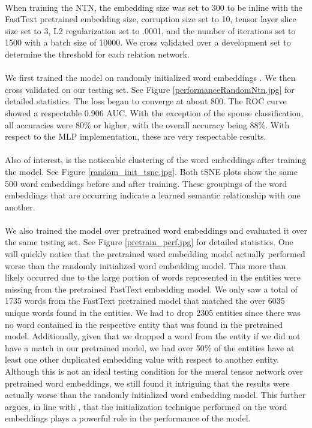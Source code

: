 \documentclass[11.5pt]{article}
\newcounter{Figure}
\begin{document}
\paragraph{} When training the NTN, the embedding size was set to 300 to be inline with the FastText pretrained embedding size, corruption size set to 10, tensor layer slice size set to 3, L2 regularization set to .0001, and the number of iterations set to 1500 with a batch size of 10000. We cross validated over a development set to determine the threshold for each relation network. 

\paragraph{} We first trained the model on randomly initialized word embeddings . We then cross validated on our testing set. See Figure \ref{performanceRandomNtn.jpg} for detailed statistics. The loss began to converge at about 800. The ROC curve showed a respectable 0.906 AUC. With the exception of the spouse classification, all accuracies were 80\% or higher, with the overall accuracy being 88\%. With respect to the MLP implementation, these are very respectable results.

\paragraph{} Also of interest, is the noticeable clustering of the word embeddings after training the model. See Figure \ref{random_init_tsne.jpg}. Both tSNE plots show the same 500 word embeddings before and after training. These groupings of the word embeddings that are occurring indicate a learned semantic relationship with one another.

\paragraph{} We also trained the model over pretrained word embeddings and evaluated it over the same testing set. See Figure \ref{pretrain_perf.jpg} for detailed statistics. One will quickly notice that the pretrained word embedding model actually performed worse than the randomly initialized word embedding model. This more than likely occurred due to the large portion of words represented in the entities were missing from the pretrained FastText embedding model. We only saw a total of 1735 words from the FastText pretrained model that matched the over 6035 unique words found in the entities. We had to drop 2305 entities since there was no word contained in the respective entity that was found in the pretrained model. Additionally, given that we dropped a word from the entity if we did not have a match in our pretrained model, we had over 50\% of the entities have at least one other duplicated embedding value with respect to another entity. Although this is not an ideal testing condition for the nueral tensor network over pretrained word embeddings, we still found it intriguing that the results were actually worse than the randomly initialized word embedding model. This further argues, in line with \cite{socher2013reasoning}, that the initialization technique performed on the word embeddings plays a powerful role in the performance of the model.
\end{document}
